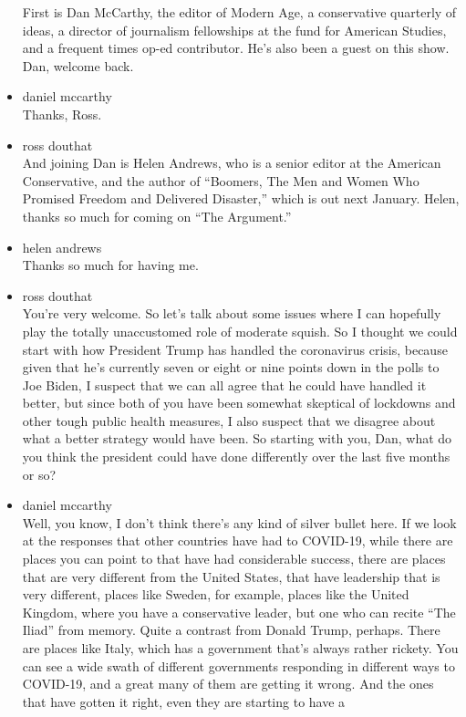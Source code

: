 \begin{itemize}
  First is Dan McCarthy, the editor of Modern Age, a conservative
  quarterly of ideas, a director of journalism fellowships at the fund
  for American Studies, and a frequent times op-ed contributor. He's
  also been a guest on this show. Dan, welcome back.
\item
  daniel mccarthy\\
  Thanks, Ross.
\item
  ross douthat\\
  And joining Dan is Helen Andrews, who is a senior editor at the
  American Conservative, and the author of ``Boomers, The Men and Women
  Who Promised Freedom and Delivered Disaster,'' which is out next
  January. Helen, thanks so much for coming on ``The Argument.''
\item
  helen andrews\\
  Thanks so much for having me.
\item
  ross douthat\\
  You're very welcome. So let's talk about some issues where I can
  hopefully play the totally unaccustomed role of moderate squish. So I
  thought we could start with how President Trump has handled the
  coronavirus crisis, because given that he's currently seven or eight
  or nine points down in the polls to Joe Biden, I suspect that we can
  all agree that he could have handled it better, but since both of you
  have been somewhat skeptical of lockdowns and other tough public
  health measures, I also suspect that we disagree about what a better
  strategy would have been. So starting with you, Dan, what do you think
  the president could have done differently over the last five months or
  so?
\item
  daniel mccarthy\\
  Well, you know, I don't think there's any kind of silver bullet here.
  If we look at the responses that other countries have had to COVID-19,
  while there are places you can point to that have had considerable
  success, there are places that are very different from the United
  States, that have leadership that is very different, places like
  Sweden, for example, places like the United Kingdom, where you have a
  conservative leader, but one who can recite ``The Iliad'' from memory.
  Quite a contrast from Donald Trump, perhaps. There are places like
  Italy, which has a government that's always rather rickety. You can
  see a wide swath of different governments responding in different ways
  to COVID-19, and a great many of them are getting it wrong. And the
  ones that have gotten it right, even they are starting to have a

\end{itemize}
